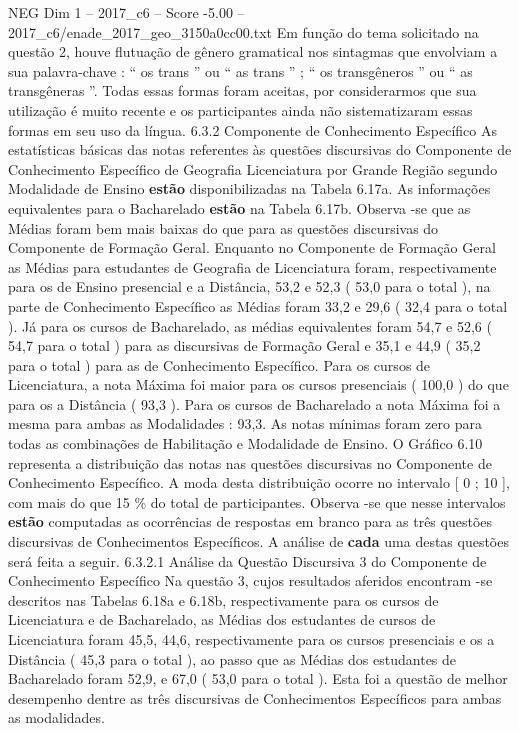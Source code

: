 \begin{textsample}{NEG Dim 1 – 2017\_c6 – Score -5.00 – 2017\_c6/enade\_2017\_geo\_3150a0cc00.txt}
Em função do tema solicitado na questão 2, houve flutuação de gênero gramatical nos sintagmas que envolviam a sua palavra-chave : “ os trans ” ou “ as trans ” ; “ os transgêneros ” ou “ as transgêneras ”.
Todas essas formas foram aceitas, por considerarmos que sua utilização é muito recente e os participantes ainda não sistematizaram essas formas em seu uso da língua. 6.3.2 Componente de Conhecimento Específico As estatísticas básicas das notas referentes às questões discursivas do Componente de Conhecimento Específico de Geografia Licenciatura por Grande Região segundo Modalidade de Ensino \textbf{estão} disponibilizadas na Tabela 6.17a.
As informações equivalentes para o Bacharelado \textbf{estão} na Tabela 6.17b.
Observa -se que as Médias foram bem mais baixas do que para as questões discursivas do Componente de Formação Geral.
Enquanto no Componente de Formação Geral as Médias para estudantes de Geografia de Licenciatura foram, respectivamente para os de Ensino presencial e a Distância, 53,2 e 52,3 ( 53,0 para o total ), na parte de Conhecimento Específico as Médias foram 33,2 e 29,6 ( 32,4 para o total ).
Já para os cursos de Bacharelado, as médias equivalentes foram 54,7 e 52,6 ( 54,7 para o total ) para as discursivas de Formação Geral e 35,1 e 44,9 ( 35,2 para o total ) para as de Conhecimento Específico.
Para os cursos de Licenciatura, a nota Máxima foi maior para os cursos presenciais ( 100,0 ) do que para os a Distância ( 93,3 ).
Para os cursos de Bacharelado a nota Máxima foi a mesma para ambas as Modalidades : 93,3.
As notas mínimas foram zero para todas as combinações de Habilitação e Modalidade de Ensino.
O Gráfico 6.10 representa a distribuição das notas nas questões discursivas no Componente de Conhecimento Específico.
A moda desta distribuição ocorre no intervalo [ 0 ; 10 ], com mais do que 15 \% do total de participantes.
Observa -se que nesse intervalos \textbf{estão} computadas as ocorrências de respostas em branco para as três questões discursivas de Conhecimentos Específicos.
A análise de \textbf{cada} uma destas questões será feita a seguir. 6.3.2.1 Análise da Questão Discursiva 3 do Componente de Conhecimento Específico Na questão 3, cujos resultados aferidos encontram -se descritos nas Tabelas 6.18a e 6.18b, respectivamente para os cursos de Licenciatura e de Bacharelado, as Médias dos estudantes de cursos de Licenciatura foram 45,5, 44,6, respectivamente para os cursos presenciais e os a Distância ( 45,3 para o total ), ao passo que as Médias dos estudantes de Bacharelado foram 52,9, e 67,0 ( 53,0 para o total ).
Esta foi a questão de melhor desempenho dentre as três discursivas de Conhecimentos Específicos para ambas as modalidades.

\end{textsample}
